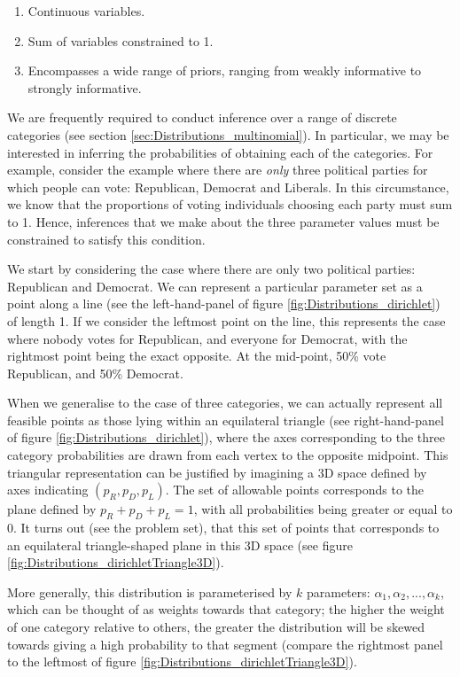\documentclass[11pt,fullpage]{book}
\begin{document}
\begin{enumerate} 
\item Continuous variables.
\item Sum of variables constrained to 1.
\item Encompasses a wide range of priors, ranging from weakly informative to strongly informative.
\end{enumerate}

We are frequently required to conduct inference over a range of discrete categories (see section \ref{sec:Distributions_multinomial}). In particular, we may be interested in inferring the probabilities of obtaining each of the categories. For example, consider the example where there are \textit{only} three political parties for which people can vote: Republican, Democrat and Liberals. In this circumstance, we know that the proportions of voting individuals choosing each party must sum to 1. Hence, inferences that we make about the three parameter values must be constrained to satisfy this condition. 

We start by considering the case where there are only two political parties: Republican and Democrat. We can represent a particular parameter set as a point along a line (see the left-hand-panel of figure \ref{fig:Distributions_dirichlet}) of length 1. If we consider the leftmost point on the line, this represents the case where nobody votes for Republican, and everyone for Democrat, with the rightmost point being the exact opposite. At the mid-point, 50\% vote Republican, and 50\% Democrat. 

When we generalise to the case of three categories, we can actually represent all feasible points as those lying within an equilateral triangle (see right-hand-panel of figure \ref{fig:Distributions_dirichlet}), where the axes corresponding to the three category probabilities are drawn from each vertex to the opposite midpoint. This triangular representation can be justified by imagining a 3D space defined by axes indicating $(p_R,p_D,p_L)$. The set of allowable points corresponds to the plane defined by $p_R+p_D+p_L=1$, with all probabilities being greater or equal to 0. It turns out (see the problem set), that this set of points that corresponds to an equilateral triangle-shaped plane in this 3D space (see figure \ref{fig:Distributions_dirichletTriangle3D}).

More generally, this distribution is parameterised by $k$ parameters: $\alpha_1,\alpha_2,...,\alpha_k$, which can be thought of as weights towards that category; the higher the weight of one category relative to others, the greater the distribution will be skewed towards giving a high probability to that segment (compare the rightmost panel to the leftmost of figure \ref{fig:Distributions_dirichletTriangle3D}).
\end{document}

